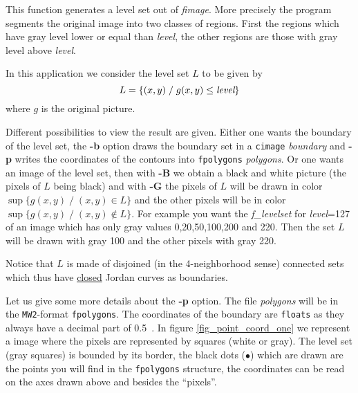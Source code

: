 This function generates a level set out of {\em fimage}. More precisely
the program segments the original image into two classes of regions.
First the regions which have gray level lower or equal than {\em level},
the other regions are those with gray level above {\em level}.

In this application we consider the level set $L$ to be given by
$$ L=\{(x,y) \;/\; g(x,y)\leq \mbox{\em level} \}$$
where $g$ is the original picture.

Different possibilities to view the result are given. Either one wants 
the boundary of the level set, the {\bf -b} option draws the boundary set
in a {\tt cimage} {\em boundary} and {\bf -p} writes the coordinates of the
contours into {\tt fpolygons} {\em polygons}. Or one wants an image 
of the level set, then with {\bf -B} we obtain a black and white picture
(the pixels of $L$ being black) and with {\bf -G} the pixels of $L$ will
be drawn in color $\sup\{g(x,y)\;/\; (x,y)\in L\}$ and the other pixels
will be in color $\sup\{g(x,y)\;/\; (x,y)\not\in L\}$. For example you
want the {\em f\_levelset} for {\em level}=127 of an image which has only
gray values 0,20,50,100,200 and 220. Then the set $L$ will be drawn with
gray 100 and the other pixels with gray 220. 

Notice that $L$ is made of
disjoined (in the 4-neighborhood sense) connected sets 
which thus have \underline{closed} Jordan curves as boundaries. 

Let us give some more details about the {\bf -p} option. The file {\em polygons}
will be in the {\tt MW2}-format {\tt fpolygons}. The coordinates of the
boundary are {\tt floats} as they always have a decimal part of 0.5\ .
In figure \ref{fig_point_coord_one} we represent a image where
the pixels are represented by squares (white or gray). The level set 
(gray squares) is bounded by its border, the black dots ($\bullet$) which are
drawn are the points  you will find in the {\tt fpolygons} structure,
the coordinates can be read on the axes drawn above and besides the ``pixels''.


